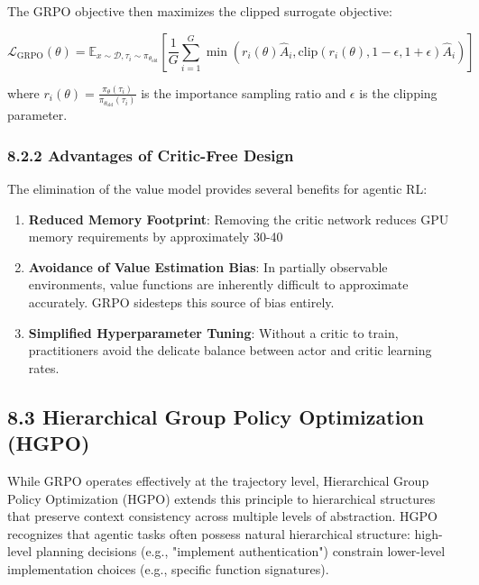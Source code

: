 The GRPO objective then maximizes the clipped surrogate objective:

$$\mathcal{L}_{\text{GRPO}}(\theta) = \mathbb{E}_{x \sim \mathcal{D}, \tau_i \sim \pi_{\theta_{\text{old}}}} \left[ \frac{1}{G}\sum_{i=1}^{G} \min\left( r_i(\theta)\hat{A}_i, \text{clip}(r_i(\theta), 1-\epsilon, 1+\epsilon)\hat{A}_i \right) \right]$$

where $r_i(\theta) = \frac{\pi_\theta(\tau_i)}{\pi_{\theta_{\text{old}}}(\tau_i)}$ is the importance sampling ratio and $\epsilon$ is the clipping parameter.

\subsubsection{8.2.2 Advantages of Critic-Free Design}

The elimination of the value model provides several benefits for agentic RL:

\begin{enumerate}
    \item \textbf{Reduced Memory Footprint}: Removing the critic network reduces GPU memory requirements by approximately 30-40%

    \item \textbf{Avoidance of Value Estimation Bias}: In partially observable environments, value functions are inherently difficult to approximate accurately. GRPO sidesteps this source of bias entirely.

    \item \textbf{Simplified Hyperparameter Tuning}: Without a critic to train, practitioners avoid the delicate balance between actor and critic learning rates.

\end{enumerate}
\subsection{8.3 Hierarchical Group Policy Optimization (HGPO)}

While GRPO operates effectively at the trajectory level, Hierarchical Group Policy Optimization (HGPO) extends this principle to hierarchical structures that preserve context consistency across multiple levels of abstraction. HGPO recognizes that agentic tasks often possess natural hierarchical structure: high-level planning decisions (e.g., "implement authentication") constrain lower-level implementation choices (e.g., specific function signatures).

